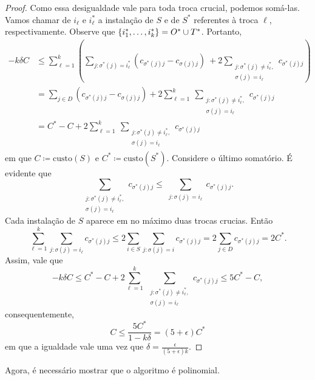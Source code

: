 \begin{proof}
Como essa desigualdade vale para toda troca crucial, podemos somá-las. Vamos chamar de $i_\ell$ e $i_\ell^*$ a instalação de $S$ e de $S^*$ referentes à troca $\ell$, respectivamente. Observe que $\{i^*_1,\ldots,i^*_k\} = O^* \cup T^* $. Portanto,
\begin{subequations}
\begin{align*}
- k \delta C &\leq \sum_{\ell = 1}^k \left(  \sum_{j : \sigma^*(j) = i_\ell^*} (c_{\sigma^*(j)j} - c_{\sigma(j)j}) \ + 2 \sum_{\substack{ j : \sigma^*(j)\neq i_\ell^*,\\  \sigma(j) = i_\ell}} c_{\sigma^*(j)j}     \right) \\
&= \sum_{j\in D} (c_{\sigma^*(j)j} - c_{\sigma(j)j}) + 2 \sum_{\ell = 1}^k \ \sum_{\substack{ j : \sigma^*(j)\neq i_\ell^*,\\  \sigma(j) = i_\ell}} c_{\sigma^*(j)j} \\
&= C^* - C + 2 \sum_{\ell = 1}^k \ \sum_{\substack{ j : \sigma^*(j)\neq i_\ell^*,\\  \sigma(j) = i_\ell}} c_{\sigma^*(j)j}
\end{align*}
\end{subequations}
em que $C \coloneqq \text{custo}(S)$ e $C^* \coloneqq \text{custo}(S^*)$. Considere o último somatório. É evidente que 
\[\sum_{\substack{ j : \sigma^*(j)\neq i_\ell^*,\\  \sigma(j) = i_\ell}} c_{\sigma^*(j)j} \leq \sum_{\substack{j:\sigma(j) = i_\ell}} c_{\sigma^*(j)j}.\]
Cada instalação de $S$ aparece em no máximo duas trocas crucias. Então
\[ \sum_{\ell=1}^k \sum_{j: \sigma(j) = i_\ell} c_{\sigma^*(j)j} \leq 2\sum_{i \in S} \sum_{j: \sigma(j) = i} c_{\sigma^*(j)j} = 2 \sum_{j\in D}c_{\sigma^*(j)j} =2 C^*.\]
Assim, vale que 
\[ - k \delta C \leq C^* - C + 2 \sum_{\ell = 1}^k \ \sum_{\substack{ j : \sigma^*(j)\neq i_\ell^*,\\  \sigma(j) = i_\ell}} c_{\sigma^*(j)j} \leq 5C^* - C,\]
consequentemente, 
\[C \leq \frac{5C^*}{1 - k\delta} = (5+\epsilon)C^*\]
em que a igualdade vale uma vez que $\delta = \frac{\epsilon}{(5+\epsilon)k}$.
\end{proof}
Agora, é necessário mostrar que o algoritmo é polinomial.

